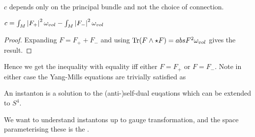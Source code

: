 \documentclass{article}
\begin{document}
\begin{prop}
	$c$ depends only on the principal bundle and not the choice of connection. 
\end{prop}
	
\begin{lemma}
	$c = \int_M \left\lvert F_+ \right\rvert^2 \omega_{vol} - \int_M \left\lvert F_- \right\rvert^2 \omega_{vol}$
\end{lemma}
\begin{proof}
Expanding $F = F_+ + F_-$ and using $\operatorname{Tr}(F \wedge \star F) = abs{F}^2 \omega_{vol}$ gives the result. 
\end{proof}
	
Hence we get the inequality 
with equality iff either $F= F_+$ or $F=F_-$. Note in either case the Yang-Mills equations are trivially satisfied as 

\begin{definition}
	An instanton is a solution to the (anti-)self-dual euqations which can be extended to $S^4$. 
\end{definition}

We want to understand instantons up to gauge transformation, and the space parameterising these is the . 



\end{document}
